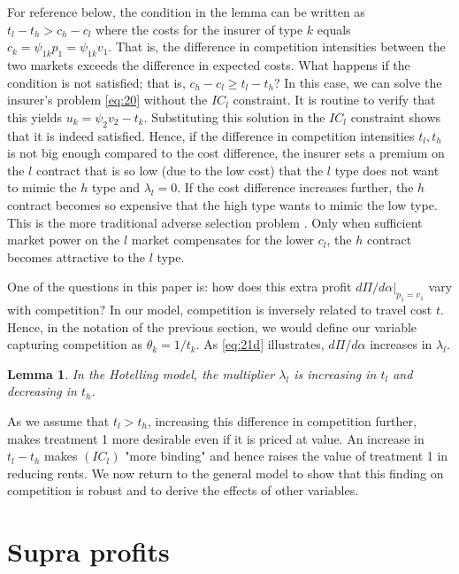 \documentclass[12pt,english,a4paper]{article}
\newtheorem{lemma}{Lemma}
\begin{document}
For reference below, the condition in the lemma can be written as \(t_l-t_h>c_h-c_l\) where the costs for the insurer of type \(k\) equals \(c_k = \psi_{1k} p_1= \psi_{1k}v_1\). That is, the difference in competition intensities between the two markets exceeds the difference in expected costs. What happens if the condition is not satisfied; that is, \(c_h -c_l \geq t_l-t_h\)? In this case, we can solve the insurer's problem \eqref{eq:20} without the \(IC_l\) constraint. It is routine to verify that this yields \(u_k = \psi_2 v_2-t_k\). Substituting this solution in the \(IC_l\) constraint shows that it is indeed satisfied. Hence, if the difference in competition intensities \(t_l,t_h\) is not big enough compared to the cost difference, the insurer sets a premium on the \(l\) contract that is so low (due to the low cost) that the \(l\) type does not want to mimic the \(h\) type and \(\lambda_l=0\). If the cost difference increases further, the \(h\) contract becomes so expensive that the high type wants to mimic the low type. This is the more traditional adverse selection problem \citep{rot76}. Only when sufficient market power on the \(l\) market compensates for the lower \(c_l\), the \(h\) contract becomes attractive to the \(l\) type.

One of the questions in this paper is: how does this extra profit \(d\Pi/d\alpha|_{p_1=v_1}\) vary with competition? In our model, competition is inversely related to travel cost \(t\). Hence, in the notation of the previous section, we would define our variable capturing competition as \(\theta_k = 1/t_k\). As \eqref{eq:21d} illustrates, \(d\Pi/d\alpha\) increases in \(\lambda_l\).

\begin{lemma}
\label{Hotelling_lambda}
In the Hotelling model, the multiplier \(\lambda_l\) is increasing in \(t_l\) and decreasing in \(t_h\).
\end{lemma}

As we assume that \(t_l > t_h\), increasing this difference in competition further, makes treatment 1 more desirable even if it is priced at value. An increase in \(t_l-t_h\) makes \((IC_l)\) "more binding" and hence raises the value of treatment 1 in reducing rents. We now return to the general model to show that this finding on competition is robust and to derive the effects of other variables.

\section{Supra profits}
\label{sec:org9bfcd29}
\end{document}

